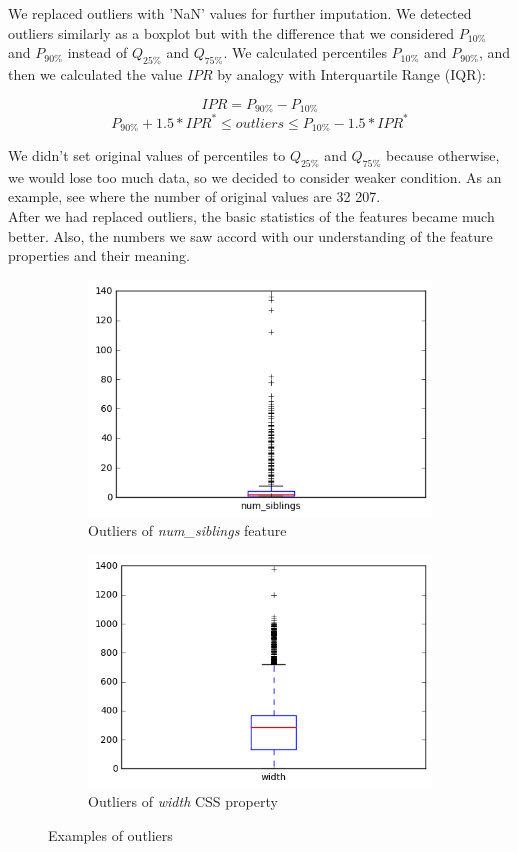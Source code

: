 We replaced outliers with 'NaN' values for further imputation. We detected outliers similarly as a boxplot but with the difference that we considered $P_{10\%}$ and $P_{90\%}$ instead of $Q_{25\%}$ and $Q_{75\%}$. We calculated percentiles $P_{10\%}$ and $P_{90\%}$, and then we calculated the value $IPR$ by analogy with Interquartile Range (IQR):

$$IPR =  P_{90\%} -  P_{10\%}$$
$$ P_{90\%} + 1.5 * IPR^* \leq outliers \leq P_{10\%} - 1.5 * IPR^* $$

We didn't set original values of percentiles to $Q_{25\%}$ and $Q_{75\%}$ because otherwise, we would lose too much data, so we decided to consider weaker condition. As an example, see where the number of original values are 32 207.\\

After we had replaced outliers, the basic statistics of the features became much better. Also, the numbers we saw accord with our understanding of the feature properties and their meaning.

\begin{figure}[h]
\begin{subfigure}{.5\textwidth}
  \centering
  \includegraphics[width=.8\linewidth]{figures06/boxplot_num_siblings}
  \caption{Outliers of \textit{num\_siblings} feature}
\end{subfigure}%
\begin{subfigure}{.5\textwidth}
  \centering
  \includegraphics[width=.8\linewidth]{figures06/boxplot_width}
  \caption{Outliers of \textit{width} CSS property}
\end{subfigure}
\caption{Examples of outliers}
\label{fig:outlier}
\end{figure}

